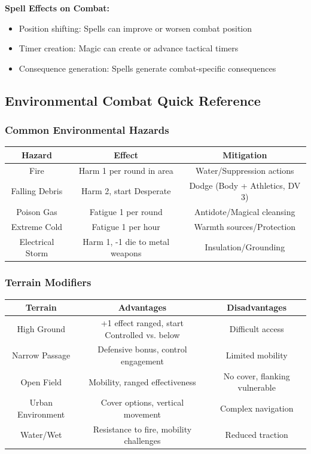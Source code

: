 \documentclass[11pt,letterpaper]{article}
\begin{document}
\textbf{Spell Effects on Combat:}
\begin{itemize}[leftmargin=*]
    \item Position shifting: Spells can improve or worsen combat position
    \item Timer creation: Magic can create or advance tactical timers
    \item Consequence generation: Spells generate combat-specific consequences
\end{itemize}

\subsection{Environmental Combat Quick Reference}

\subsubsection{Common Environmental Hazards}

\begin{center}
\begin{tabular}{|c|c|c|}
\hline
\textbf{Hazard} & \textbf{Effect} & \textbf{Mitigation} \\
\hline
Fire & Harm 1 per round in area & Water/Suppression actions \\
\hline
Falling Debris & Harm 2, start Desperate & Dodge (Body + Athletics, DV 3) \\
\hline
Poison Gas & Fatigue 1 per round & Antidote/Magical cleansing \\
\hline
Extreme Cold & Fatigue 1 per hour & Warmth sources/Protection \\
\hline
Electrical Storm & Harm 1, -1 die to metal weapons & Insulation/Grounding \\
\hline
\end{tabular}
\end{center}

\subsubsection{Terrain Modifiers}

\begin{center}
\begin{tabular}{|c|c|c|}
\hline
\textbf{Terrain} & \textbf{Advantages} & \textbf{Disadvantages} \\
\hline
High Ground & +1 effect ranged, start Controlled vs. below & Difficult access \\
\hline
Narrow Passage & Defensive bonus, control engagement & Limited mobility \\
\hline
Open Field & Mobility, ranged effectiveness & No cover, flanking vulnerable \\
\hline
Urban Environment & Cover options, vertical movement & Complex navigation \\
\hline
Water/Wet & Resistance to fire, mobility challenges & Reduced traction \\
\hline
\end{tabular}
\end{center}
\end{document}
